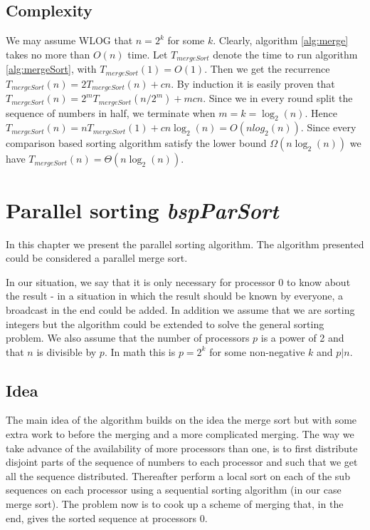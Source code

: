 \documentclass[a4paper,12pt,article]{memoir}
\theoremstyle{plain}
\theoremstyle{definition}
\theoremstyle{remark}
\theoremstyle{plain}
\theoremstyle{remark}
\begin{document}
\section{Complexity}
We may assume WLOG that $n=2^k$ for some $k$. Clearly, algorithm \ref{alg:merge} takes no more than $O(n)$ time. Let $T_{mergeSort}$ denote the time to run algorithm \ref{alg:mergeSort}, with $T_{mergeSort}(1)=O(1)$. Then we get the recurrence $T_{mergeSort}(n)=2T_{mergeSort}(n)+cn$. By induction it is easily proven that $T_{mergeSort}(n)=2^mT_{mergeSort}(n/2^m)+mcn$. Since we in every round split the sequence of numbers in half, we terminate when $m=k=\log_2(n)$. Hence $T_{mergeSort}(n)=nT_{mergeSort}(1)+cn\log_2(n)=O(nlog_2(n))$. Since every comparison based sorting algorithm satisfy the lower bound $\Omega(n\log_2(n))$ we have $T_{mergeSort}(n)=\Theta(n\log_2(n))$. 
\newpage

\chapter{Parallel sorting \textit{bspParSort}}
In this chapter we present the parallel sorting algorithm. The algorithm presented could be considered a parallel merge sort. 

In our situation, we say that it is only necessary for processor 0 to know about the result - in a situation in which the result should be known by everyone, a broadcast in the end could be added. In addition we assume that we are sorting integers but the algorithm could be extended to solve the general sorting problem. We also assume that the number of processors $p$ is a power of 2 and that $n$ is divisible by $p$. In math this is $p=2^k$ for some non-negative $k$ and $p\vert n$. 
  
\section{Idea}
The main idea of the algorithm builds on the idea the merge sort but with some extra work to before the merging and a more complicated merging. The way we take advance of the availability of more processors than one, is to first distribute disjoint parts of the sequence of numbers to each processor and such that we get all the sequence distributed. Thereafter perform a local sort on each of the sub sequences on each processor using a sequential sorting algorithm (in our case merge sort). The problem now is to cook up a scheme of merging that, in the end, gives the sorted sequence at processors 0. 
\end{document}
